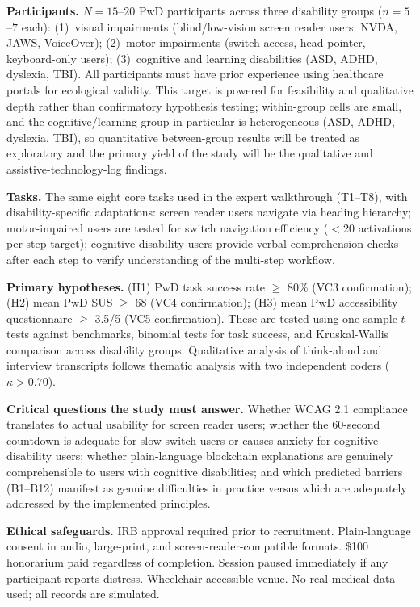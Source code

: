 \documentclass[journal,onecolumn]{IEEEtran}
\begin{document}
\textbf{Participants.} $N = 15$--$20$ PwD participants across three disability groups ($n = 5$--$7$ each): (1)~visual impairments (blind/low-vision screen reader users: NVDA, JAWS, VoiceOver); (2)~motor impairments (switch access, head pointer, keyboard-only users); (3)~cognitive and learning disabilities (ASD, ADHD, dyslexia, TBI). All participants must have prior experience using healthcare portals for ecological validity. This target is powered for feasibility and qualitative depth rather than confirmatory hypothesis testing; within-group cells are small, and the cognitive/learning group in particular is heterogeneous (ASD, ADHD, dyslexia, TBI), so quantitative between-group results will be treated as exploratory and the primary yield of the study will be the qualitative and assistive-technology-log findings.

\textbf{Tasks.} The same eight core tasks used in the expert walkthrough (T1--T8), with disability-specific adaptations: screen reader users navigate via heading hierarchy; motor-impaired users are tested for switch navigation efficiency ($<$20 activations per step target); cognitive disability users provide verbal comprehension checks after each step to verify understanding of the multi-step workflow.

\textbf{Primary hypotheses.} (H1) PwD task success rate $\geq$ 80\% (VC3 confirmation); (H2) mean PwD SUS $\geq$ 68 (VC4 confirmation); (H3) mean PwD accessibility questionnaire $\geq$ 3.5/5 (VC5 confirmation). These are tested using one-sample $t$-tests against benchmarks, binomial tests for task success, and Kruskal-Wallis comparison across disability groups. Qualitative analysis of think-aloud and interview transcripts follows thematic analysis \cite{braun2006using} with two independent coders ($\kappa > 0.70$).

\textbf{Critical questions the study must answer.} Whether WCAG 2.1 compliance translates to actual usability for screen reader users; whether the 60-second countdown is adequate for slow switch users or causes anxiety for cognitive disability users; whether plain-language blockchain explanations are genuinely comprehensible to users with cognitive disabilities; and which predicted barriers (B1--B12) manifest as genuine difficulties in practice versus which are adequately addressed by the implemented principles.

\textbf{Ethical safeguards.} IRB approval required prior to recruitment. Plain-language consent in audio, large-print, and screen-reader-compatible formats. \$100 honorarium paid regardless of completion. Session paused immediately if any participant reports distress. Wheelchair-accessible venue. No real medical data used; all records are simulated.
\end{document}
